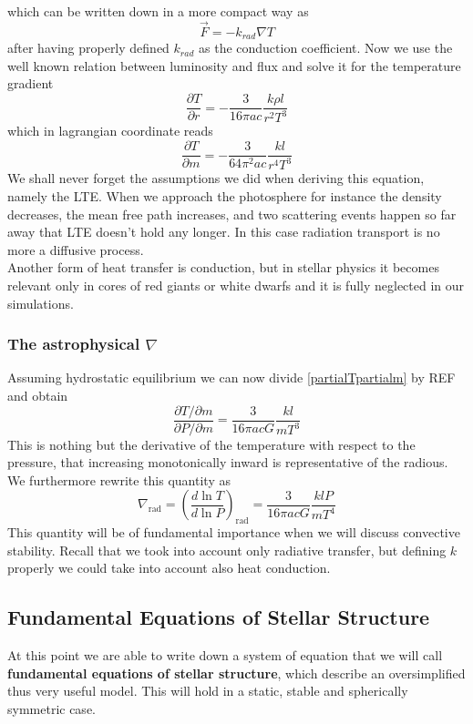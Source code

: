 \documentclass[11pt]{article}
\numberwithin{equation}{section}
\begin{document}
which can be written down in a more compact way as 
\begin{equation}
	\vec F = - k_{rad} \nabla T
\end{equation}
after having properly defined $k_{rad}$ as the conduction coefficient. Now we use the well known relation between luminosity and flux and solve it for the temperature gradient
\begin{equation}
	\frac{\partial T}{\partial r}= - \frac{3}{16 \pi a c}\frac{k \rho l}{r^2 T^3}
\end{equation}
which in lagrangian coordinate reads
\begin{equation}\label{partialTpartialm}
	\frac{\partial T}{\partial m}= - \frac{3}{64 \pi^2 a c}\frac{k l}{r^4 T^3}
\end{equation}
We shall never forget the assumptions we did when deriving this equation, namely the LTE. When we approach the photosphere for instance the density decreases, the mean free path increases, and two scattering events happen so far away that LTE doesn't hold any longer. In this case radiation transport is no more a diffusive process. \\ 
Another form of heat transfer is conduction, but in stellar physics it becomes relevant only in cores of red giants or white dwarfs and it is fully neglected in our simulations.
\subsubsection{The astrophysical $\nabla$}
Assuming hydrostatic equilibrium we can now divide \ref{partialTpartialm} by REF and obtain
\begin{equation}
	\frac{\partial T/\partial m}{\partial P / \partial m} = \frac{3}{16 \pi a c G} \frac{k l}{m T^3}
\end{equation}
This is nothing but the derivative of the temperature with respect to the pressure, that increasing monotonically inward is representative of the radious. We furthermore rewrite this quantity as
\begin{equation}\label{nablarad}
	\nabla_{\mathrm{rad}} = \left( \frac{d \ln T}{d \ln P}  \right)_{\mathrm{rad}}= \frac{3}{16 \pi a c G} \frac{k l P}{m T^4}
\end{equation}
This quantity will be of fundamental importance when we will discuss convective stability. Recall that we took into account only radiative transfer, but defining $k$ properly we could take into account also heat conduction.
\subsection{Fundamental Equations of Stellar Structure}
At this point we are able to write down a system of equation that we will call \textbf{fundamental equations of stellar structure}, which describe an oversimplified thus very useful model. This will hold in a static, stable and spherically symmetric case.\\
\end{document}
